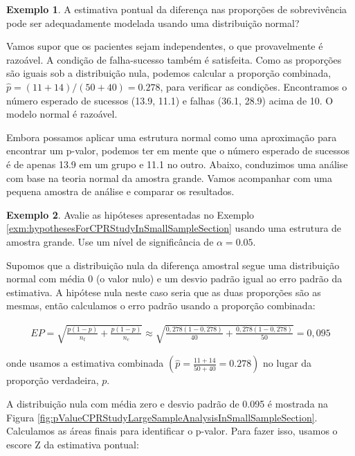 \documentclass[
]{book}
\theoremstyle{definition}
\theoremstyle{definition}
\newtheorem{example}{Exemplo}[chapter]
\theoremstyle{definition}
\theoremstyle{definition}
\theoremstyle{remark}
\begin{document}
\begin{example}
\protect\hypertarget{exm:unnamed-chunk-264}{}{\label{exm:unnamed-chunk-264} }A estimativa pontual da diferença nas proporções de sobrevivência pode ser adequadamente modelada usando uma distribuição normal?
\end{example}

Vamos supor que os pacientes sejam independentes, o que provavelmente é razoável. A condição de falha-sucesso também é satisfeita. Como as proporções são iguais sob a distribuição nula, podemos calcular a proporção combinada, \(\hat{p} = (11+14)/(50+40) = 0.278\), para verificar as condições. Encontramos o número esperado de sucessos (13.9, 11.1) e falhas (36.1, 28.9) acima de 10. O modelo normal é razoável.

Embora possamos aplicar uma estrutura normal como uma aproximação para encontrar um p-valor, podemos ter em mente que o número esperado de sucessos é de apenas 13.9 em um grupo e 11.1 no outro. Abaixo, conduzimos uma análise com base na teoria normal da amostra grande. Vamos acompanhar com uma pequena amostra de análise e comparar os resultados.

\begin{example}
\protect\hypertarget{exm:unnamed-chunk-265}{}{\label{exm:unnamed-chunk-265} }Avalie as hipóteses apresentadas no Exemplo \ref{exm:hypothesesForCPRStudyInSmallSampleSection} usando uma estrutura de amostra grande. Use um nível de significância de \(\alpha=0.05\).
\end{example}

Supomos que a distribuição nula da diferença amostral segue uma distribuição normal com média 0 (o valor nulo) e um desvio padrão igual ao erro padrão da estimativa. A hipótese nula neste caso seria que as duas proporções são as mesmas, então calculamos o erro padrão usando a proporção combinada:

\begin{align*}
EP = \sqrt{\frac{p(1-p)}{n_t} + \frac{p(1-p)}{n_c}}
    \approx \sqrt{\frac{0,278(1-0,278)}{40} + \frac{0,278(1-0,278)}{50}} = 0,095
\end{align*}

onde usamos a estimativa combinada \(\left( \hat{p} = \frac{11+14}{50 + 40} = 0.278 \right)\) no lugar da proporção verdadeira, \(p\).

A distribuição nula com média zero e desvio padrão de 0.095 é mostrada na Figura \ref{fig:pValueCPRStudyLargeSampleAnalysisInSmallSampleSection}. Calculamos as áreas finais para identificar o p-valor. Para fazer isso, usamos o escore Z da estimativa pontual:
\end{document}
